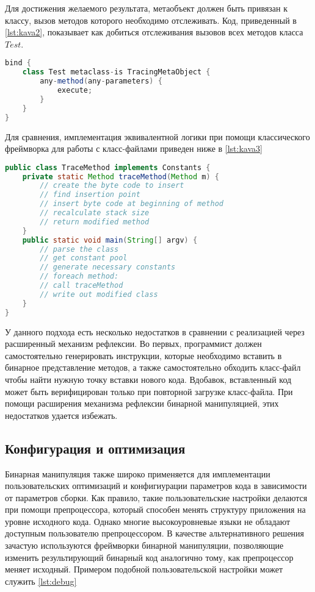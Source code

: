 Для достижения желаемого результата, метаобъект должен быть привязан к классу, вызов методов которого необходимо отслеживать. Код, приведенный в \autoref{lst:kava2}, показывает как добиться отслеживания вызовов всех методов класса $Test$.

\begin{lstlisting}[language=Java, caption=Привязка класса к метаобъекту в $Kava$, label=lst:kava2]
bind {
    class Test metaclass-is TracingMetaObject {
        any-method(any-parameters) {
            execute;
        }
    }
}
\end{lstlisting}

Для сравнения, имплементация эквивалентной логики при помощи классического фреймворка для работы с класс-файлами приведен ниже в \autoref{lst:kava3}

\begin{lstlisting}[language=Java, caption=Реализация аналогичной функциональности при помощи классического фреймворка для работы с класс-файлом, label=lst:kava3]
public class TraceMethod implements Constants {
    private static Method traceMethod(Method m) {
        // create the byte code to insert
        // find insertion point
        // insert byte code at beginning of method
        // recalculate stack size
        // return modified method
    }
    public static void main(String[] argv) {
        // parse the class
        // get constant pool
        // generate necessary constants
        // foreach method:
        // call traceMethod
        // write out modified class
    }
}
\end{lstlisting}

У данного подхода есть несколько недостатков в сравнении с реализацией через расширенный механизм рефлексии. Во первых, программист должен самостоятельно генерировать инструкции, которые необходимо вставить в бинарное представление методов, а также самостоятельно обходить класс-файл чтобы найти нужную точку вставки нового кода. Вдобавок, вставленный код может быть верифицирован только при повторной загрузке класс-файла. При помощи расширения механизма рефлексии бинарной манипуляцией, этих недостатков удается избежать.

\subsection{Конфигурация и оптимизация}

Бинарная манипуляция также широко применяется для имплементации пользовательских оптимизаций и конфигиурации параметров кода в зависимости от параметров сборки. Как правило, такие пользовательские настройки делаются при помощи препроцессора, который способен менять структуру приложения на уровне исходного кода. Однако многие высокоуровневые языки не обладают доступным пользователю препроцессором. В качестве альтернативного решения зачастую используются фреймворки бинарной манипуляции, позволяющие изменить результирующий бинарный код аналогично тому, как препроцессор меняет исходный. Примером подобной пользовательской настройки может служить \autoref{lst:debug}

